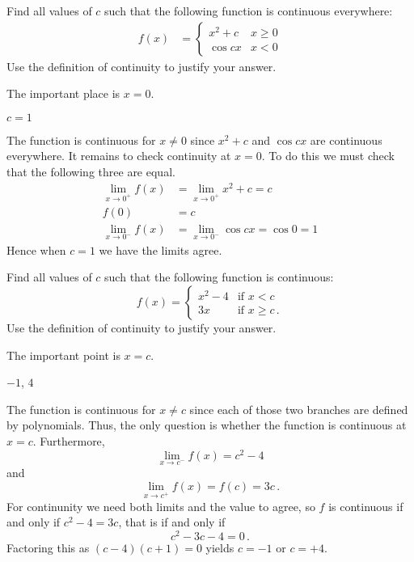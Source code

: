 \begin{question}[2015Q]
Find all values of $c$ such that the following function is continuous everywhere:
\begin{align*}
  f(x) &= \begin{cases}
           x^2+c & x\geq 0\\
	  \cos cx & x< 0
          \end{cases}
\end{align*}
Use the definition of continuity to justify your answer.
\end{question}
\begin{hint} The important place is $x=0$.
\end{hint}
\begin{answer} $c=1$
\end{answer}
\begin{solution}
The function is continuous for $x \ne 0$ since $x^2+c$ and
          $\cos cx$ are continuous everywhere. It remains to check continuity at
$x=0$. To do this we must check that the following three are equal.
\begin{align*}
  \lim_{x \to 0^+} f(x) &= \lim_{x\to 0^+} x^2+c = c\\
  f(0) &= c \\
  \lim_{x \to 0^-} f(x) &= \lim_{x\to 0^-} \cos cx = \cos 0 = 1
\end{align*}
Hence when $c=1$ we have the limits agree.
\end{solution}



\begin{Mquestion}[2015Q]
Find all values of $c$ such that the following function is continuous:
\[f(x) = \begin{cases}
      x^2-4 & \text{if } x< c\\
      3x &  \text{if } x \ge c\,.
\end{cases} \]
Use the definition of continuity to justify your answer.
\end{Mquestion}
\begin{hint} The important point is $x=c$.
\end{hint}
\begin{answer}$-1$, $4$
\end{answer}
\begin{solution}
The function is continuous for $x\ne c$ since each of those two branches are
defined by polynomials.  Thus, the only question is
whether the function is continuous at $x=c$. Furthermore,
$$\lim_{x\to c^-}f(x) = c^2-4 $$
and
$$\lim_{x\to c^+}f(x) = f(c) = 3c\,.$$
For continunity we need both limits and the value to agree, so $f$ is
continuous if and only if $c^2-4 = 3c$, that is if and only if
$$ c^2-3c-4 = 0\,.$$
Factoring this as $(c-4)(c+1) = 0$ yields $c=-1$ or $c=+4$.
\end{solution}


